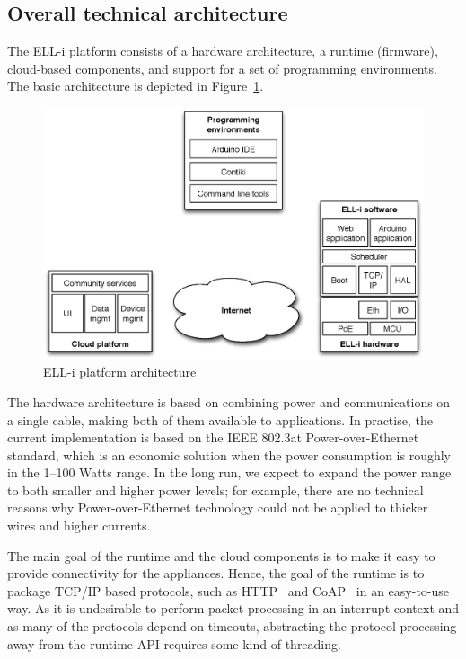 \documentclass{siamltex}
\begin{document}
\subsection{Overall technical architecture}

The ELL-i platform consists of a hardware architecture, a runtime
(firmware), cloud-based components, and support for a set of
programming environments.  The basic architecture is depicted in
Figure~\ref{fig:arch}.

\begin{figure}
\centering
\includegraphics[scale=.55]{figure-arch.eps}
\caption{ELL-i platform architecture}
\label{fig:arch}
\end{figure}

The hardware architecture is based on combining power and
communications on a single cable, making both of them available to
applications.  In practise, the current implementation is based on the
IEEE 802.3at Power-over-Ethernet standard, which is an economic
solution when the power consumption is roughly in the 1--100 Watts
range. In the long run, we expect to expand the power range to both
smaller and higher power levels; for example, there are no technical
reasons why Power-over-Ethernet technology could not be applied to thicker wires
and higher currents.

The main goal of the runtime and the cloud components is to make it easy
to provide connectivity for the appliances.  Hence, the goal of the
runtime is to package TCP/IP based protocols, such as HTTP~\cite{fielding1999hypertext}
and CoAP~\cite{shelby2013constrained} in an easy-to-use way.  As it is undesirable to
perform packet processing in an interrupt context and as many of the
protocols depend on timeouts, abstracting the protocol processing away
from the runtime API requires some kind of threading.
\end{document}

